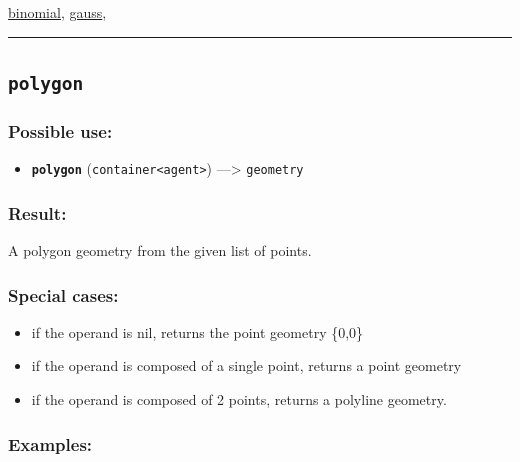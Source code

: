 \documentclass[]{book}
\providecommand{\tightlist}{%
  \setlength{\itemsep}{0pt}\setlength{\parskip}{0pt}}
\theoremstyle{definition}
\theoremstyle{definition}
\theoremstyle{definition}
\theoremstyle{remark}
\begin{document}
\href{operators-b-to-c.html\#binomial}{binomial},
\href{operators-d-to-h.html\#gauss}{gauss},

\begin{center}\rule{0.5\linewidth}{\linethickness}\end{center}

\subsection{\texorpdfstring{\texttt{polygon}}{polygon}}\label{polygon}

\subsubsection{Possible use:}\label{possible-use-413}

\begin{itemize}
\tightlist
\item
  \textbf{\texttt{polygon}}
  (\texttt{container\textless{}agent\textgreater{}}) ---\textgreater{}
  \texttt{geometry}
\end{itemize}

\subsubsection{Result:}\label{result-399}

A polygon geometry from the given list of points.

\subsubsection{Special cases:}\label{special-cases-111}

\begin{itemize}
\tightlist
\item
  if the operand is nil, returns the point geometry \{0,0\}\\
\item
  if the operand is composed of a single point, returns a point
  geometry\\
\item
  if the operand is composed of 2 points, returns a polyline geometry.
\end{itemize}

\subsubsection{Examples:}\label{examples-287}
\end{document}

